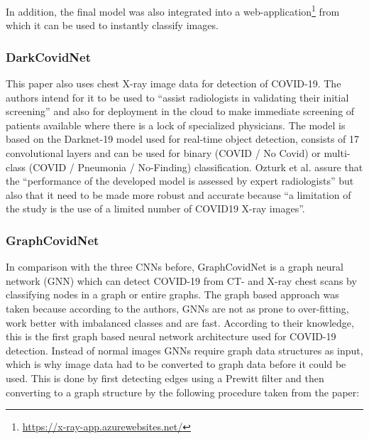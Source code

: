 In addition, the final model was also integrated into a web-application\footnote{\url{https://x-ray-app.azurewebsites.net/}} from which it can be used to instantly classify images.

\subsubsection{DarkCovidNet}
This paper also uses chest X-ray image data for detection of COVID-19. The authors intend for it to be used to \enquote{assist radiologists in validating their initial screening}\cite{dark_net} and also for deployment in the cloud to make immediate screening of patients available where there is a lock of specialized physicians. The model is based on the Darknet-19 model used for real-time object detection\cite{darknet_19}, consists of 17 convolutional layers and can be used for binary (COVID / No Covid) or multi-class (COVID / Pneumonia / No-Finding) classification.
Ozturk et al. assure that the \enquote{performance of the developed model is assessed by expert radiologists} but also that it need to be made more robust and accurate because \enquote{a limitation of the study is the use of a limited number of COVID19 X-ray images}\cite{dark_net}.

\subsubsection{GraphCovidNet}\label{subsubsec:methods_graphcovidnet}
In comparison with the three CNNs before, GraphCovidNet is a graph neural network (GNN) which can detect COVID-19 from CT- and X-ray chest scans by classifying nodes in a graph or entire graphs. The graph based approach was taken because according to the authors, GNNs are not as prone to over-fitting, work better with imbalanced classes and are fast\cite{graph_covid_net}. According to their knowledge, this is the first graph based neural network architecture used for COVID-19 detection.
Instead of normal images GNNs require graph data structures as input, which is why image data had to be converted to graph data before it could be used. This is done by first detecting edges using a Prewitt filter and then converting to a graph structure by the following procedure taken from the paper:

